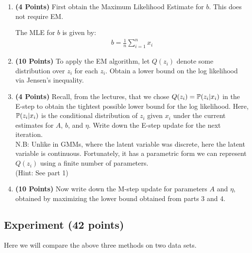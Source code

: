 \begin{enumerate}
\item \textbf{(4 Points)}
First obtain the Maximum Likelihood Estimate for $b$. This does not require EM.

\begin{soln}
  The MLE for $b$ is given by:
  \begin{align*}
    b = \frac{1}{n} \sum_{i=1}^n x_i
  \end{align*}
\end{soln}

\item \textbf{(10 Points)}
To apply the EM algorithm,
let $Q(z_i)$  denote some distribution over $z_i$ for each $z_i$.
Obtain a lower bound on the log likelihood via Jensen's inequality.

\item \textbf{(4 Points)}
Recall, from the lectures, that we chose
$Q(z_i) =  \mathbb{P}(z_i|x_i)$ in the E-step to obtain the tightest
possible lower bound for the log likelihood.
Here, $ \mathbb{P}(z_i|x_i)$ is the conditional distribution of $z_i$
given $x_i$ under the current estimates for $A$, $b$, and $\eta$.
Write down the E-step update for the next iteration. \\
N.B: Unlike in GMMs, where the latent variable was discrete, here the latent variable is continuous. Fortunately, it has a parametric form we can represent $Q(z_i)$ using a finite number of parameters. \\
(Hint: See part 1)

\item \textbf{(10 Points)}
Now write down the M-step update for parameters $A$ and $\eta$, obtained
by maximizing the lower bound obtained from parts 3 and 4.

\end{enumerate}

 
\subsection{Experiment (42 points)}

Here we will compare the above three methods on two data sets. 

